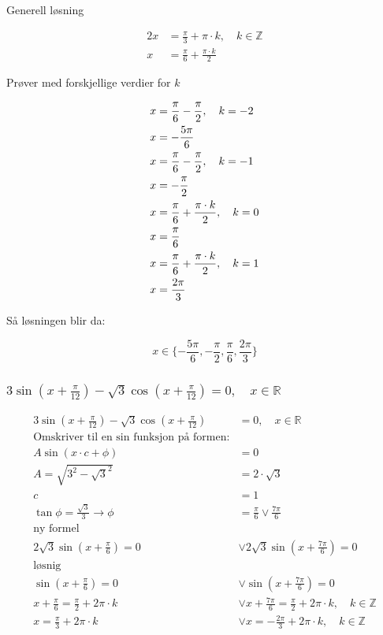 \documentclass{article}
\begin{document}
Generell løsning

\begin{align*}
    2x &= \frac{\pi}{3} + \pi \cdot k, \quad k \in \mathbb{Z} \\
    x &= \frac{\pi}{6} + \frac{\pi \cdot k}{2}
\end{align*}

Prøver med forskjellige verdier for $k$

\begin{align*}
    x &= \frac{\pi}{6} - \frac{\pi}{2}, \quad k = -2 \\
    x &= -\frac{5\pi}{6}
    \newline \\
    x &= \frac{\pi}{6} - \frac{\pi}{2}, \quad k = -1 \\
    x &= -\frac{\pi}{2}
    \newline \\
    x &= \frac{\pi}{6} + \frac{\pi \cdot k}{2}, \quad k = 0 \\
    x &= \frac{\pi}{6}
    \newline \\
    x &= \frac{\pi}{6} + \frac{\pi \cdot k}{2}, \quad k = 1 \\
    x &= \frac{2\pi}{3}
    \newline \\
\end{align*}

Så løsningen blir da:

$$ x \in \{ -\frac{5\pi}{6}, -\frac{\pi}{2}, \frac{\pi}{6} , \frac{2\pi}{3} \} $$

\subsubsection{$3 \sin(x + \frac{\pi}{12}) - \sqrt{3} \cos (x+\frac{\pi}{12})=0, \quad x\in\mathbb{R}$}

\begin{align*}
    3 \sin(x + \frac{\pi}{12}) - \sqrt{3} \cos (x+\frac{\pi}{12}) &= 0, \quad x\in\mathbb{R} \\
    \text{Omskriver til en sin funksjon på formen:} \\
    A \sin (x \cdot c+\phi) &= 0 \\
    A = \sqrt{3^2 - \sqrt{3}^2} &= 2 \cdot \sqrt{3} \\
    c &= 1 \\
    \tan \phi = \frac{\sqrt{3}}{3} \rightarrow \phi &= \frac{\pi}{6} \lor \frac{7\pi}{6} \\
    \text{ny formel} \\
    2\sqrt3 \sin (x+\frac{\pi}{6}) = 0 & \lor  2\sqrt{3} \sin (x+\frac{7\pi}{6}) = 0 \\
    \text{løsnig} \\
    \sin (x+\frac{\pi}{6}) = 0 & \lor \sin (x+\frac{7\pi}{6}) = 0 \\
    x+\frac{\pi}{6} = \frac{\pi}{2} + 2\pi \cdot k & \lor  x+\frac{7\pi}{6} = \frac{\pi}{2} + 2\pi \cdot k, \quad k\in\mathbb{Z} \\
    x = \frac{\pi}{3} + 2\pi \cdot k & \lor  x = -\frac{2\pi}{3} + 2\pi \cdot k, \quad k\in\mathbb{Z}
\end{align*}
\end{document}
